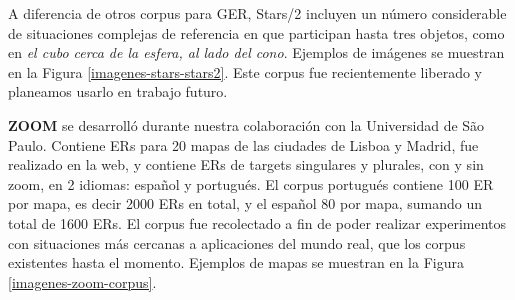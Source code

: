 A diferencia de otros corpus para GER, Stars/2 incluyen un n\'umero considerable de situaciones complejas de referencia en que participan hasta tres objetos, como en {\it el cubo cerca de la esfera, al lado del cono}. Ejemplos de im\'agenes se muestran en la Figura \ref{imagenes-stars-stars2}. Este corpus fue recientemente liberado y planeamos usarlo en trabajo futuro.


\label{sec:corpusZOOM}
{\bf ZOOM} \cite{DBLP:conf/acl/AltamiranoFPB15} se desarroll\'o durante nuestra colaboraci\'on con la Universidad de S\~ao Paulo. Contiene ERs para 20 mapas de las ciudades de Lisboa y Madrid, fue realizado en la web, y contiene ERs de targets singulares y plurales, con y sin zoom, en 2 idiomas: espa\~nol y portugu\'es. El corpus portugu\'es contiene 100 ER por mapa, es decir 2000 ERs en total, y el espa\~nol 80 por mapa, sumando un total de 1600 ERs. El corpus fue recolectado a fin de poder realizar experimentos con situaciones m\'as cercanas a aplicaciones del mundo real, que los corpus existentes hasta el momento. Ejemplos de mapas se muestran en la Figura \ref{imagenes-zoom-corpus}.



